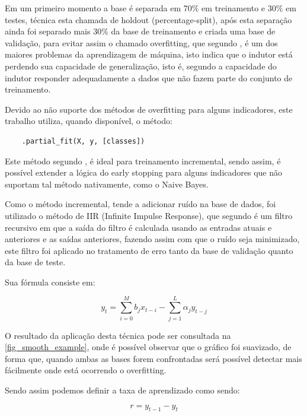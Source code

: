 \documentclass[
article,			%
11pt,				%
oneside,			%
a4paper,			%
english,			%
brazil,				%
sumario=tradicional,
]{abntex2}
\begin{document}
	Em um primeiro momento a base é separada em 70\%  em treinamento e 30\% em testes, técnica esta chamada de holdout (percentage-split), após esta separação ainda foi separado mais 30\% da base de treinamento e criada uma base de validação, para evitar assim o chamado overfitting, que segundo , é um dos maiores problemas da aprendizagem de máquina, isto indica que o indutor está perdendo sua capacidade de generalização, isto é, segundo  a capacidade do indutor responder adequadamente a dados que não fazem parte do conjunto de treinamento.
	
	Devido ao não suporte dos métodos de overfitting para alguns indicadores, este trabalho utiliza, quando disponível, o método:
	
	\begin{verbatim}
	.partial_fit(X, y, [classes])
	\end{verbatim}
	
	Este método segundo , é ideal para treinamento incremental, sendo assim, é possível extender a lógica do early stopping para alguns indicadores que não suportam tal método nativamente, como o Naive Bayes.
	
	Como o método incremental, tende a adicionar ruído na base de dados, foi utilizado o método de IIR (Infinite Impulse Response), que segundo  é um filtro recursivo em que a saída do filtro é calculada usando as entradas atuais e anteriores e as saídas anteriores, fazendo assim com que o ruído seja minimizado, este filtro foi aplicado no tratamento de erro tanto da base de validação quanto da base de teste.
	
	Sua fórmula consiste em:
	
	\begin{equation}
	y_t = \sum_{i=0}^M {b_jx_{t-i}} - \sum_{j=1}^{L} \alpha_j {y_{t-j}}
	\end{equation}
	
	O resultado da aplicação desta técnica pode ser consultada na  \autoref{fig_smooth_example}, onde é possível observar que o gráfico foi suavizado, de forma que, quando ambas as bases forem confrontadas será possível detectar mais fácilmente onde está ocorrendo o overfitting.
	
	Sendo assim podemos definir a taxa de aprendizado como sendo:
	
	\begin{equation}
	r = {y_{t-1}} - {y_{t}}
	\end{equation}
	
\end{document}
